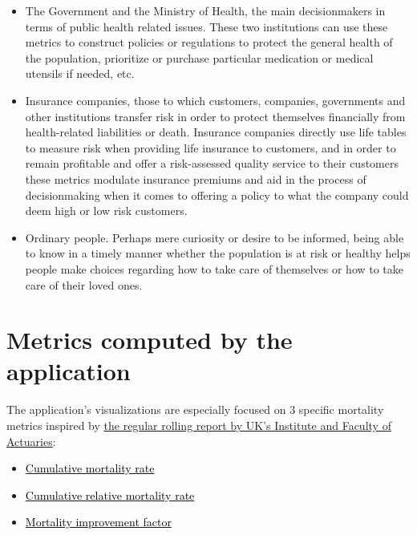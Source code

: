 \documentclass[
  a4paper]{article}
\begin{document}
\begin{itemize}
\item
  The Government and the Ministry of Health, the main decisionmakers in
  terms of public health related issues. These two institutions can use
  these metrics to construct policies or regulations to protect the
  general health of the population, prioritize or purchase particular
  medication or medical utensils if needed, etc.
\item
  Insurance companies, those to which customers, companies, governments
  and other institutions transfer risk in order to protect themselves
  financially from health-related liabilities or death. Insurance
  companies directly use life tables to measure risk when providing life
  insurance to customers, and in order to remain profitable and offer a
  risk-assessed quality service to their customers these metrics
  modulate insurance premiums and aid in the process of decisionmaking
  when it comes to offering a policy to what the company could deem high
  or low risk customers.
\item
  Ordinary people. Perhaps mere curiosity or desire to be informed,
  being able to know in a timely manner whether the population is at
  risk or healthy helps people make choices regarding how to take care
  of themselves or how to take care of their loved ones.
\end{itemize}

\hypertarget{Metrics}{%
\section{Metrics computed by the application}\label{Metrics}}

The application's visualizations are especially focused on 3 specific
mortality metrics inspired by
\href{https://www.actuaries.org.uk/learn-and-develop/continuous-mortality-investigation/other-cmi-outputs/mortality-monitor}{the
regular rolling report by UK's Institute and Faculty of Actuaries}:

\begin{itemize}
\item
  \protect\hyperlink{CMR}{\textcolor{black}{Cumulative mortality rate}}
\item
  \protect\hyperlink{CRMR}{\textcolor{black}{Cumulative relative
  mortality rate}}
\item
  \protect\hyperlink{CMIF}{\textcolor{black}{Mortality improvement
  factor}}
\end{itemize}
\end{document}

